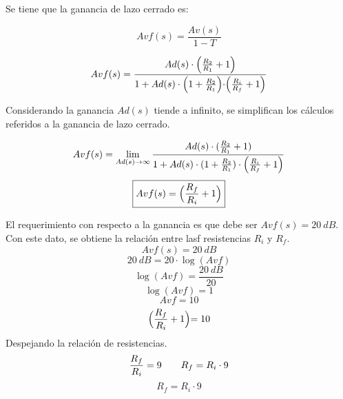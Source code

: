 \bigskip
\hspace{1mm} Se tiene que la ganancia de lazo cerrado es:

\begin{equation}
    Avf(s) = \frac{Av(s)}{1-T}
\end{equation}

\begin{equation}
      Avf(s) = \frac{Ad(s)\cdot \Bigl(\frac{R_2}{R_1}+1\Bigl)}{1+Ad(s)\cdot \Bigl(1+\frac{R_2}{R_1}\Bigl)\cdot \Bigl(\frac{R_i}{R_f}+1\Bigl)}
\end{equation}

\bigskip
\hspace{1mm} Considerando la ganancia \(Ad(s)\) tiende a infinito, se simplifican los cálculos referidos a la ganancia de lazo cerrado.

\bigskip
\begin{equation}
      Avf(s) = \lim_{Ad(s)\to\infty} \frac{Ad(s)\cdot (\frac{R_2}{R_1}+1)}{1+Ad(s)\cdot (1+\frac{R_2}{R_1})\cdot \Bigl(\frac{R_i}{R_f}+1\Bigl)}
\end{equation}
\begin{equation}
    \boxed{
        Avf(s)=\Bigl(\frac{R_f}{R_i}+1\Bigl) 
    }
\end{equation}

\bigskip
\hspace{1mm} El requerimiento con respecto a la ganancia es que debe ser \(Avf(s)=20~dB\). Con este dato, se obtiene la relación entre lasf resistencias \(R_i\) y \(R_f\).
\begin{equation}
    Avf(s)=20~dB
\end{equation}
\begin{equation}
    20~dB=20\cdot\log{(Avf)}
\end{equation}
\begin{equation}
    \log{(Avf)}=\frac{20~dB}{20}
\end{equation}
\begin{equation}
    \log{(Avf)}=1
\end{equation}
\begin{equation}
    Avf=10
\end{equation}
\begin{equation}
    \Bigl(\frac{R_f}{R_i}+1\Bigl)=10
\end{equation}
\bigskip
\hspace{1mm} Despejando la relación de resistencias.
\bigskip
\begin{equation}
    \frac{R_f}{R_i} = 9 \hspace{7mm} R_f=R_i \cdot 9
\end{equation}
\begin{equation}
    R_f=R_i \cdot 9
\end{equation}

